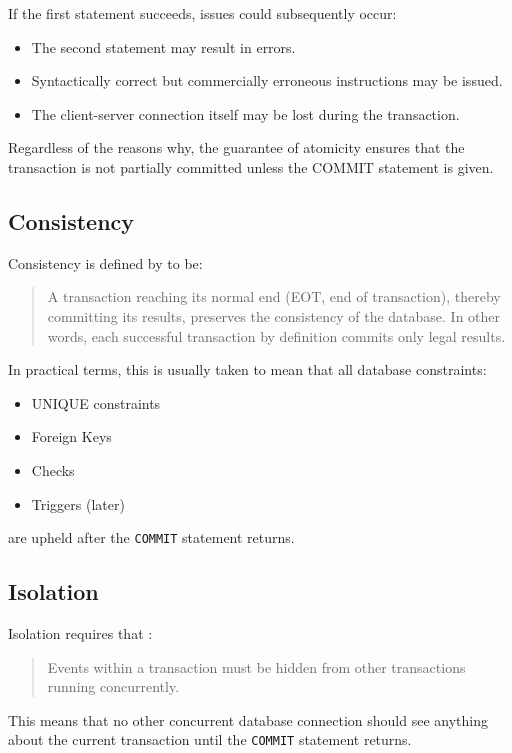 \documentclass[slides]{pgnotes}
\begin{document}
If the first statement succeeds, issues could subsequently occur:
\begin{itemize}
\item The second statement may result in errors.
\item Syntactically correct but commercially erroneous instructions may be issued.
\item The client-server connection itself may be lost during the transaction.
\end{itemize}
Regardless of the reasons why, the guarantee of atomicity ensures that the transaction is not partially committed unless the COMMIT statement is given.


\subsection{Consistency}
\label{sec:consistency}

Consistency is defined by \citet{haerder:1983:principles} to be:
\begin{quotation}
  A transaction reaching its normal end (EOT, end of transaction), thereby committing its results, preserves the consistency of the database.
  In other words, each successful transaction by definition commits only legal results.
\end{quotation}

In practical terms, this is usually taken to mean that all database constraints:
\begin{itemize}
\item UNIQUE constraints
\item Foreign Keys
\item Checks
\item Triggers (later)
\end{itemize}
are upheld after the \texttt{COMMIT} statement returns.

\subsection{Isolation} 
\label{sec:isolation}

Isolation requires that \citep{haerder:1983:principles}:
\begin{quotation}
  Events within a transaction must be hidden from other transactions running concurrently.
\end{quotation}
This means that no other concurrent database connection should see anything about the current transaction until the \texttt{COMMIT} statement returns.
\end{document}
